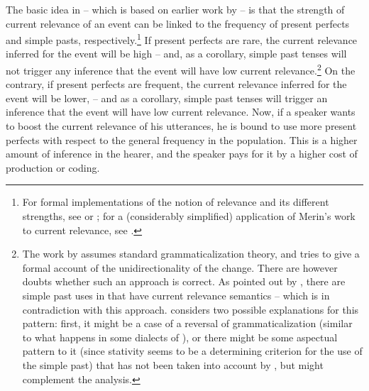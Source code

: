\documentclass[output=paper,hidelinks]{langscibook}
\begin{document}
The basic idea in \citet{schaden12a} -- which is based on earlier work by \citet{dahl01} -- is that the strength of current relevance of an event can be linked to the frequency of present perfects and simple pasts, respectively.\footnote{For formal implementations of the notion of relevance and its different strengths, see \citet{merin99} or \citet{parikh09}; for a (considerably simplified) application of Merin's work to current relevance, see \citet{schaden13}.} If present perfects are rare, the current relevance inferred for the event will be high -- and, as a corollary, simple past tenses will not trigger any inference that the event will have low current relevance.\footnote{The work by \citet{schaden12a} assumes standard grammaticalization theory, and tries to give a formal account of the unidirectionality of the change. There are however doubts whether such an approach is correct. As pointed out by \citet{nilsson16}, there are simple past uses in  that have current relevance semantics -- which is in contradiction with this approach. \citet{nilsson16} considers two possible explanations for this pattern: first, it might be a case of a reversal of grammaticalization (similar to what happens in some dialects of ), or there might be some aspectual pattern to it (since stativity seems to be a determining criterion for the use of the simple past) that has not been taken into account by \citet{schaden12a}, but might complement the analysis.} On the contrary, if present perfects are frequent, the current relevance inferred for the event will be lower, -- and as a corollary, simple past tenses will trigger an inference that the event will have low current relevance. Now, if a speaker wants to boost the current relevance of his utterances, he is bound to use more present perfects with respect to the general frequency in the population. This is a higher amount of inference in the hearer, and the speaker pays for it by a higher cost of production or coding.
\end{document}
